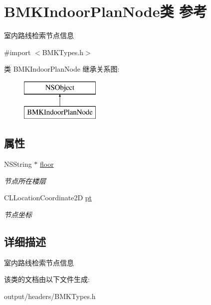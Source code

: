 \hypertarget{interface_b_m_k_indoor_plan_node}{}\section{B\+M\+K\+Indoor\+Plan\+Node类 参考}
\label{interface_b_m_k_indoor_plan_node}


室内路线检索节点信息  




{\ttfamily \#import $<$B\+M\+K\+Types.\+h$>$}

类 B\+M\+K\+Indoor\+Plan\+Node 继承关系图\+:\begin{figure}[H]
\begin{center}
\leavevmode
\includegraphics[height=2.000000cm]{interface_b_m_k_indoor_plan_node}
\end{center}
\end{figure}
\subsection*{属性}
\begin{DoxyCompactItemize}
\item 
\hypertarget{interface_b_m_k_indoor_plan_node_aad86da6328e8b2249873335790e2c3d9}{}N\+S\+String $\ast$ \hyperlink{interface_b_m_k_indoor_plan_node_aad86da6328e8b2249873335790e2c3d9}{floor}\label{interface_b_m_k_indoor_plan_node_aad86da6328e8b2249873335790e2c3d9}

\begin{DoxyCompactList}\small\item\em 节点所在楼层 \end{DoxyCompactList}\item 
\hypertarget{interface_b_m_k_indoor_plan_node_af33404fbfbe5e52c4e19a0a3794b46e6}{}C\+L\+Location\+Coordinate2\+D \hyperlink{interface_b_m_k_indoor_plan_node_af33404fbfbe5e52c4e19a0a3794b46e6}{pt}\label{interface_b_m_k_indoor_plan_node_af33404fbfbe5e52c4e19a0a3794b46e6}

\begin{DoxyCompactList}\small\item\em 节点坐标 \end{DoxyCompactList}\end{DoxyCompactItemize}


\subsection{详细描述}
室内路线检索节点信息 

该类的文档由以下文件生成\+:\begin{DoxyCompactItemize}
\item 
output/headers/B\+M\+K\+Types.\+h\end{DoxyCompactItemize}
